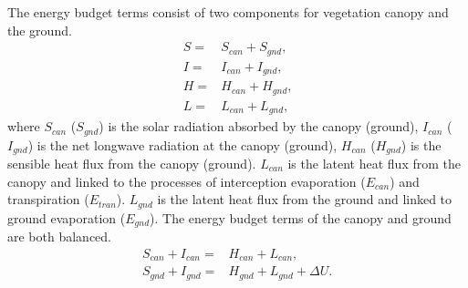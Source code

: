 \documentclass[essd]{copernicus}
\begin{document}
The energy budget terms consist of two components for vegetation canopy and the
ground.
\begin{align}
    S = & S_{can} + S_{gnd} \text{,} \\
    I = & I_{can} + I_{gnd} \text{,} \\
    H = & H_{can} + H_{gnd} \text{,} \\
    L = & L_{can} + L_{gnd} \text{,}
\end{align}
where $S_{can}$ ($S_{gnd}$) is the solar radiation absorbed by the canopy
(ground), $I_{can}$ ($I_{gnd}$) is the net longwave radiation at the canopy
(ground), $H_{can}$ ($H_{gnd}$) is the sensible heat flux from the canopy
(ground). $L_{can}$ is the latent heat flux from the canopy and linked to the
processes of interception evaporation ($E_{can}$) and transpiration
($E_{tran}$). $L_{gnd}$ is the latent heat flux from the ground and linked to
ground evaporation ($E_{gnd}$). The energy budget terms of the canopy and ground
are both balanced.
\begin{align}
    S_{can} + I_{can} = & H_{can} + L_{can} \text{,}            \\
    S_{gnd} + I_{gnd} = & H_{gnd} + L_{gnd} + \Delta U \text{.}
\end{align}
\end{document}
